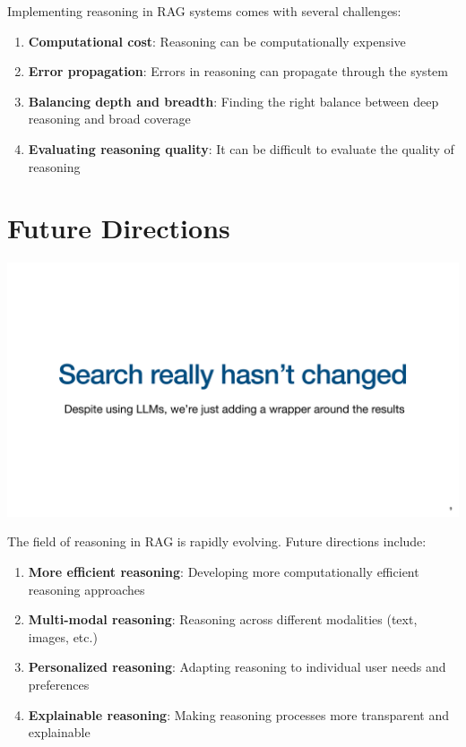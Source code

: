 \documentclass[
  letterpaper,
  oneside]{scrbook}
\providecommand{\tightlist}{%
  \setlength{\itemsep}{0pt}\setlength{\parskip}{0pt}}\usepackage{longtable,booktabs,array}
\begin{document}
Implementing reasoning in RAG systems comes with several challenges:

\begin{enumerate}
\def\labelenumi{\arabic{enumi}.}
\tightlist
\item
  \textbf{Computational cost}: Reasoning can be computationally
  expensive
\item
  \textbf{Error propagation}: Errors in reasoning can propagate through
  the system
\item
  \textbf{Balancing depth and breadth}: Finding the right balance
  between deep reasoning and broad coverage
\item
  \textbf{Evaluating reasoning quality}: It can be difficult to evaluate
  the quality of reasoning
\end{enumerate}

\section{Future Directions}\label{future-directions}

\includegraphics{chapters/../p3-images/slide_11.png}

The field of reasoning in RAG is rapidly evolving. Future directions
include:

\begin{enumerate}
\def\labelenumi{\arabic{enumi}.}
\tightlist
\item
  \textbf{More efficient reasoning}: Developing more computationally
  efficient reasoning approaches
\item
  \textbf{Multi-modal reasoning}: Reasoning across different modalities
  (text, images, etc.)
\item
  \textbf{Personalized reasoning}: Adapting reasoning to individual user
  needs and preferences
\item
  \textbf{Explainable reasoning}: Making reasoning processes more
  transparent and explainable
\end{enumerate}
\end{document}
